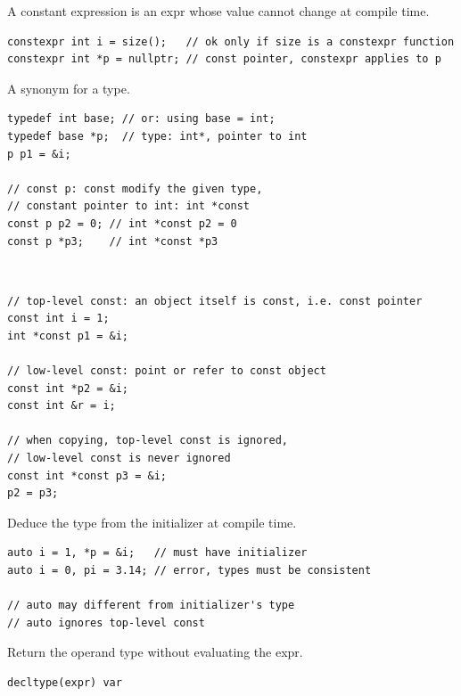 \documentclass{article}
\begin{document}
\begin{definition}
    A constant expression is an expr whose value cannot change at compile time.
    \begin{verbatim}
constexpr int i = size();   // ok only if size is a constexpr function
constexpr int *p = nullptr; // const pointer, constexpr applies to p
\end{verbatim}
\end{definition}

\begin{definition}
    A synonym for a type.
    \begin{verbatim}
typedef int base; // or: using base = int;
typedef base *p;  // type: int*, pointer to int
p p1 = &i;

// const p: const modify the given type,
// constant pointer to int: int *const
const p p2 = 0; // int *const p2 = 0
const p *p3;    // int *const *p3
\end{verbatim}
\end{definition}

\begin{definition}~
    \begin{verbatim}
// top-level const: an object itself is const, i.e. const pointer
const int i = 1;
int *const p1 = &i;

// low-level const: point or refer to const object
const int *p2 = &i;
const int &r = i;

// when copying, top-level const is ignored,
// low-level const is never ignored
const int *const p3 = &i;
p2 = p3;
\end{verbatim}
\end{definition}

\begin{definition}[auto]
    Deduce the type from the initializer at compile time.
    \begin{verbatim}
auto i = 1, *p = &i;   // must have initializer
auto i = 0, pi = 3.14; // error, types must be consistent

// auto may different from initializer's type
// auto ignores top-level const
\end{verbatim}
\end{definition}

\begin{definition}[decltype]
    Return the operand type without evaluating the expr.
    \begin{verbatim}
decltype(expr) var
\end{verbatim}
\end{definition}
\end{document}
